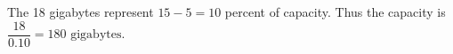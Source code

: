 The 18 gigabytes represent $15-5=10$ percent of capacity. Thus the capacity is $\dfrac{18}{0.10}=\boxed{180\text{ gigabytes}}$.

